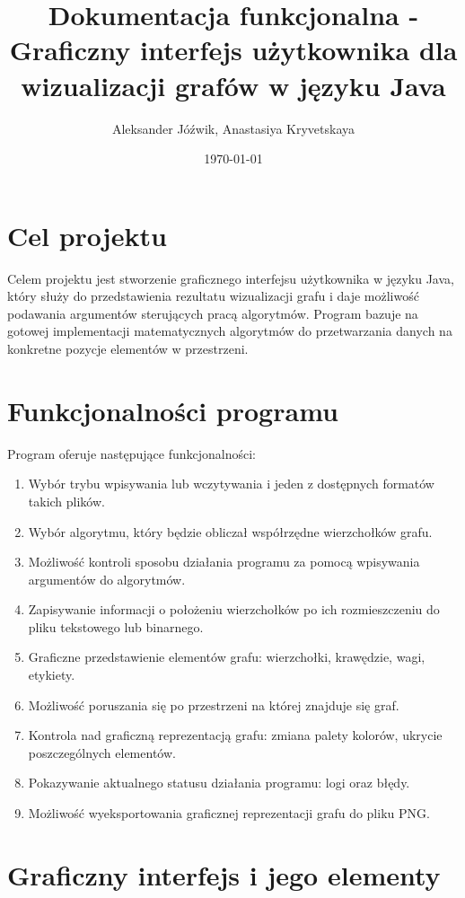 \documentclass[]{article}
\title{Dokumentacja funkcjonalna - Graficzny interfejs użytkownika dla wizualizacji grafów w języku Java}
\author{\authoricon Aleksander Jóźwik, Anastasiya Kryvetskaya}
\date{\dateicon \today}
\begin{document}
	\noindent
	\maketitle

	\tableofcontents
	\clearpage

	\section{Cel projektu}
	Celem projektu jest stworzenie graficznego interfejsu użytkownika w języku Java, który służy do przedstawienia rezultatu wizualizacji grafu i 
	daje możliwość podawania argumentów sterujących pracą algorytmów. Program bazuje na gotowej implementacji matematycznych algorytmów 
	do przetwarzania danych na konkretne pozycje elementów w przestrzeni.

	\section{Funkcjonalności programu}
	Program oferuje następujące funkcjonalności:
	\begin{enumerate}
		\item Wybór trybu wpisywania lub wczytywania i jeden z dostępnych formatów takich plików.
		\item Wybór algorytmu, który będzie obliczał współrzędne wierzchołków grafu.
		\item Możliwość kontroli sposobu działania programu za pomocą wpisywania argumentów do algorytmów.
		\item Zapisywanie informacji o położeniu wierzchołków po ich rozmieszczeniu do pliku tekstowego lub binarnego.
		\item Graficzne przedstawienie elementów grafu: wierzchołki, krawędzie, wagi, etykiety.
		\item Możliwość poruszania się po przestrzeni na której znajduje się graf.
		\item Kontrola nad graficzną reprezentacją grafu: zmiana palety kolorów, ukrycie poszczególnych elementów.
		\item Pokazywanie aktualnego statusu działania programu: logi oraz błędy.
		\item Możliwość wyeksportowania graficznej reprezentacji grafu do pliku PNG.
	\end{enumerate}
	\clearpage
	
	\section{Graficzny interfejs i jego elementy}
	
\end{document}
